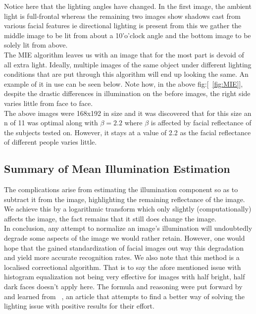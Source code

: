 	Notice here that the lighting angles have changed.  In the first image, the ambient light is full-frontal whereas the remaining 
	two images show shadows cast from various facial features ie directional lighting is present from this we gather the middle image 
	to be lit from about a 10'o'clock angle and the bottom image to be solely lit from above. \\
			
	The MIE algorithm leaves us with an image that for the most part is devoid of all extra light.  Ideally, multiple images of the same object 
	under different lighting conditions that are put through this algorithm will end up looking the same.  An example of it in use 
	can be seen below.  Note how, in the above fig:[~\ref{fig:MIE}], despite the drastic differences in illumination on the before 
	images, the right side varies little from face to face. \\
		
	The above images were 168x192 in size and it was discovered that for this size an n of 11 was optimal along with $\beta = 2.2$ 
	where $\beta$ is affected by facial reflectance of the subjects tested on.  However, it stays at a value of 2.2 as the facial 
	reflectance of different people varies little.
		
\subsection{Summary of Mean Illumination Estimation}
	The complications arise from estimating the illumination component so as to subtract it from the image, highlighting the remaining 
	reflectance of the image.  We achieve this by a logarithmic transform which only slightly (computationally) affects 
	the image, the fact remains that it still does change the image. \\
		
	In conclusion, any attempt to normalize an image's illumination will undoubtedly degrade some aspects of the image we would rather 
	retain.  However, one would hope that the gained standardization of facial images out way this degradation and yield more accurate 
	recognition rates.  We also note that this method is a localised correctional algorithm.  That is to say the afore mentioned issue 
	with histogram equalization not being very effective for images with half bright, half dark faces doesn't apply here.  The formula 
	and reasoning were put forward by and learned from ~\cite{LuoaRINMBoMEfFR}, an article that attempts to find a better way of solving 
	the lighting issue with positive results for their effort. \\
	
